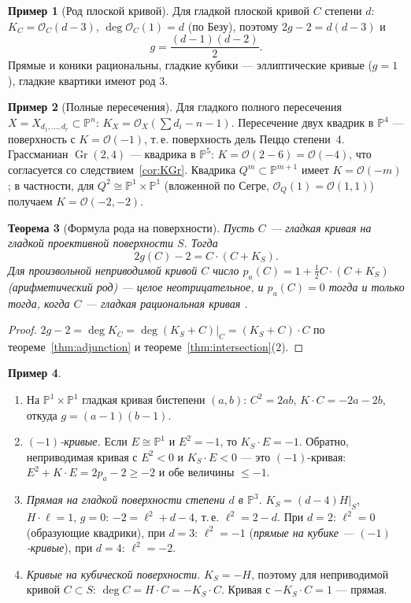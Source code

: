 \documentclass[11pt,a4paper]{article}
\theoremstyle{plain}
\newtheorem{theorem}{Теорема}[section]
\theoremstyle{definition}
\newtheorem{example}[theorem]{Пример}
\theoremstyle{remark}
\newcommand{\PP}{\mathbb{P}}
\newcommand{\cO}{\mathcal{O}}
\DeclareMathOperator{\Gr}{Gr}
\begin{document}
\begin{example}[Род плоской кривой]
Для гладкой плоской кривой $C$ степени $d$: $K_C=\cO_C(d-3)$, $\deg\cO_C(1)=d$ (по Безу), поэтому
$2g-2=d(d-3)$ и
\[
g=\frac{(d-1)(d-2)}2 .
\]
Прямые и коники рациональны, гладкие кубики --- эллиптические кривые ($g=1$), гладкие квартики имеют род 3.
\end{example}

\begin{example}[Полные пересечения]
Для гладкого полного пересечения $X=X_{d_1,\dots,d_r}\subset\PP^n$: $K_X=\cO_X(\sum d_i-n-1)$.
Пересечение двух квадрик в $\PP^4$ --- поверхность с $K=\cO(-1)$, т.\,е. поверхность дель Пеццо
степени~4. Грассманиан $\Gr(2,4)$ --- квадрика в $\PP^5$: $K=\cO(2-6)=\cO(-4)$, что согласуется со
следствием~\ref{cor:KGr}. Квадрика $Q^m\subset\PP^{m+1}$ имеет $K=\cO(-m)$; в частности, для
$Q^2\cong\PP^1\times\PP^1$ (вложенной по Сегре, $\cO_Q(1)=\cO(1,1)$) получаем $K=\cO(-2,-2)$.
\end{example}

\begin{theorem}[Формула рода на поверхности]\label{thm:genus-formula}
Пусть $C$ --- гладкая кривая на гладкой проективной поверхности $S$. Тогда
\[
2g(C)-2=C\cdot(C+K_S).
\]
Для произвольной неприводимой кривой $C$ число $p_a(C)=1+\frac12C\cdot(C+K_S)$ (\emph{арифметический
род}) --- целое неотрицательное, и $p_a(C)=0$ тогда и только тогда, когда $C$ --- гладкая рациональная
кривая \cite[V, упр.~1.3]{Ha}.
\end{theorem}
\begin{proof}
$2g-2=\deg K_C=\deg(K_S+C)|_C=(K_S+C)\cdot C$ по теореме~\ref{thm:adjunction} и
теореме~\ref{thm:intersection}(2).
\end{proof}

\begin{example}\label{ex:adj-surfaces}
\begin{enumerate}
\item На $\PP^1\times\PP^1$ гладкая кривая бистепени $(a,b)$: $C^2=2ab$, $K\cdot C=-2a-2b$, откуда
$g=(a-1)(b-1)$.
\item \emph{$(-1)$-кривые.} Если $E\cong\PP^1$ и $E^2=-1$, то $K_S\cdot E=-1$. Обратно, неприводимая кривая
с $E^2<0$ и $K_S\cdot E<0$ --- это $(-1)$-кривая: $E^2+K\cdot E=2p_a-2\ge-2$ и обе величины $\le-1$.
\item \emph{Прямая на гладкой поверхности степени $d$ в $\PP^3$.} $K_S=(d-4)H|_S$, $H\cdot\ell=1$, $g=0$:
$-2=\ell^2+d-4$, т.\,е. $\ell^2=2-d$. При $d=2$: $\ell^2=0$ (образующие квадрики), при $d=3$:
$\ell^2=-1$ (\emph{прямые на кубике --- $(-1)$-кривые}), при $d=4$: $\ell^2=-2$.
\item \emph{Кривые на кубической поверхности.} $K_S=-H$, поэтому для неприводимой кривой
$C\subset S$: $\deg C=H\cdot C=-K_S\cdot C$. Кривая с $-K_S\cdot C=1$ --- прямая.
\end{enumerate}
\end{example}
\end{document}
